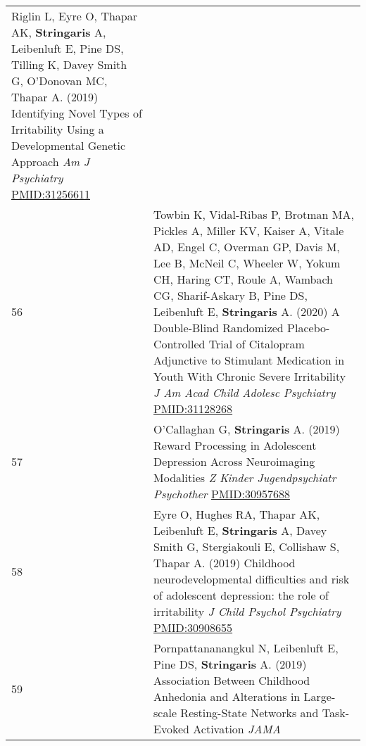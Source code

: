 \documentclass[
]{article}
\begin{document}
\begin{longtable}[]{@{}ll@{}}
\begin{minipage}[t]{0.94\columnwidth}
Riglin L, Eyre O, Thapar AK, \textbf{Stringaris} A, Leibenluft E, Pine
DS, Tilling K, Davey Smith G, O'Donovan MC, Thapar A. (2019) Identifying
Novel Types of Irritability Using a Developmental Genetic Approach
\emph{Am J Psychiatry} \url{PMID:31256611}\strut
\end{minipage}\tabularnewline
\begin{minipage}[t]{0.01\columnwidth}\raggedright
56\strut
\end{minipage} & \begin{minipage}[t]{0.94\columnwidth}\raggedright
Towbin K, Vidal-Ribas P, Brotman MA, Pickles A, Miller KV, Kaiser A,
Vitale AD, Engel C, Overman GP, Davis M, Lee B, McNeil C, Wheeler W,
Yokum CH, Haring CT, Roule A, Wambach CG, Sharif-Askary B, Pine DS,
Leibenluft E, \textbf{Stringaris} A. (2020) A Double-Blind Randomized
Placebo-Controlled Trial of Citalopram Adjunctive to Stimulant
Medication in Youth With Chronic Severe Irritability \emph{J Am Acad
Child Adolesc Psychiatry} \url{PMID:31128268}\strut
\end{minipage}\tabularnewline
\begin{minipage}[t]{0.01\columnwidth}\raggedright
57\strut
\end{minipage} & \begin{minipage}[t]{0.94\columnwidth}\raggedright
O'Callaghan G, \textbf{Stringaris} A. (2019) Reward Processing in
Adolescent Depression Across Neuroimaging Modalities \emph{Z Kinder
Jugendpsychiatr Psychother} \url{PMID:30957688}\strut
\end{minipage}\tabularnewline
\begin{minipage}[t]{0.01\columnwidth}\raggedright
58\strut
\end{minipage} & \begin{minipage}[t]{0.94\columnwidth}\raggedright
Eyre O, Hughes RA, Thapar AK, Leibenluft E, \textbf{Stringaris} A, Davey
Smith G, Stergiakouli E, Collishaw S, Thapar A. (2019) Childhood
neurodevelopmental difficulties and risk of adolescent depression: the
role of irritability \emph{J Child Psychol Psychiatry}
\url{PMID:30908655}\strut
\end{minipage}\tabularnewline
\begin{minipage}[t]{0.01\columnwidth}\raggedright
59\strut
\end{minipage} & \begin{minipage}[t]{0.94\columnwidth}\raggedright
Pornpattananangkul N, Leibenluft E, Pine DS, \textbf{Stringaris} A.
(2019) Association Between Childhood Anhedonia and Alterations in
Large-scale Resting-State Networks and Task-Evoked Activation \emph{JAMA
}
\end{minipage}
\end{longtable}
\end{document}
